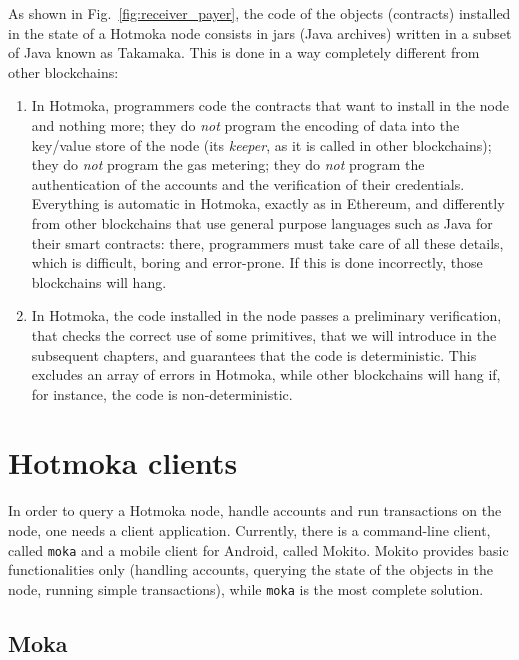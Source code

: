 As shown in Fig.~\ref{fig:receiver_payer}, the code of the objects (contracts) installed in
the state of a Hotmoka node consists in jars (Java archives) written in a subset of Java
known as Takamaka. This is done in a way completely different from other blockchains:

\begin{enumerate}
\item In Hotmoka, programmers code the contracts that want to install in the node and nothing more;
  they do \emph{not} program the encoding of data into the
  key/value store of the node (its \emph{keeper},
  as it is called in other blockchains); they do \emph{not} program the gas metering;
  they do \emph{not}
  program the authentication of the accounts and the verification of their credentials.
  Everything is automatic in Hotmoka, exactly as in Ethereum, and differently from other blockchains
  that use general purpose languages such as Java for their smart contracts: there, programmers
  must take care of all these details, which is difficult, boring and error-prone. If this is done
  incorrectly, those blockchains will hang.
\item In Hotmoka, the code installed in the node passes
  a preliminary verification, that checks the correct
  use of some primitives, that we will introduce in the subsequent chapters, and guarantees that the
  code is deterministic. This excludes an array of errors in Hotmoka, while other blockchains
  will hang if, for instance, the code is non-deterministic.
\end{enumerate}

\section{Hotmoka clients}\label{sec:hotmoka_clients}

In order to query a Hotmoka node, handle accounts and run transactions on the node,
one needs a client application. Currently, there is a command-line client, called
\texttt{moka} and a mobile client for Android, called Mokito. Mokito provides
basic functionalities only (handling accounts, querying the state of the objects in the node,
running simple transactions), while \texttt{moka} is the most complete solution.

\subsection{Moka}\label{subsec:moka}

